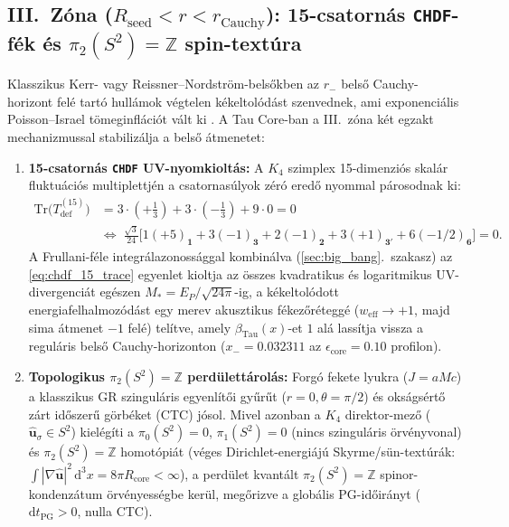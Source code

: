 \documentclass[11pt,a4paper]{article}
\theoremstyle{remark}
\begin{document}
\subsection{III.\ Z\'ona (\texorpdfstring{$R_{\mathrm{seed}} < r < r_{\mathrm{Cauchy}}$}{R\_seed < r < r\_Cauchy}): 15-csatorn\'as \texttt{CHDF}-f\'ek \'es \texorpdfstring{$\pi_2(S^2) = \mathbb{Z}$}{pi\_2(S\^2) = Z} spin-text\'ura}

Klasszikus Kerr- vagy Reissner--Nordstr\"om-bels\H{o}kben az $r_-$ bels\H{o} Cauchy-horizont fel\'e tart\'o hull\'amok v\'egtelen k\'ekeltol\'od\'ast szenvednek, ami exponenci\'alis Poisson--Israel t\"omeginfl\'aci\'ot v\'alt ki \cite{PoissonIsrael1990}. A Tau Core-ban a III.\ z\'ona k\'et egzakt mechanizmussal stabiliz\'alja a bels\H{o} \'atmenetet:
\begin{enumerate}
  \item \textbf{15-csatorn\'as \texttt{CHDF} UV-nyomkiolt\'as:} A $K_4$ szimplex 15-dimenzi\'os skal\'ar fluktu\'aci\'os multiplettj\'en a csatornas\'ulyok z\'er\'o ered\H{o} nyommal p\'arosodnak ki:
  \begin{align}
    \mathrm{Tr}\!\bigl(T_{\mathrm{def}}^{(15)}\bigr)
    &= 3\cdot\!\left(+\frac{1}{3}\right) + 3\cdot\!\left(-\frac{1}{3}\right) + 9\cdot 0 = 0 \nonumber\\
    &\Longleftrightarrow\;
    \frac{\sqrt{3}}{24}\bigl[1(+5)_{\mathbf{1}} + 3(-1)_{\mathbf{3}} + 2(-1)_{\mathbf{2}} + 3(+1)_{\mathbf{3}'} + 6(-1/2)_{\mathbf{6}}\bigr] = 0.
    \label{eq:chdf_15_trace}
  \end{align}
  A Frullani-f\'ele integr\'alazonoss\'aggal kombin\'alva (\ref{sec:big_bang}.\ szakasz) az \eqref{eq:chdf_15_trace} egyenlet kioltja az \"osszes kvadratikus \'es logaritmikus UV-divergenci\'at eg\'eszen $M_* = E_P/\sqrt{24\pi}$-ig, a k\'ekeltol\'odott energiafelhalmoz\'od\'ast egy merev akusztikus f\'ekez\H{o}r\'etegg\'e ($w_{\mathrm{eff}} \to +1$, majd sima \'atmenet $-1$ fel\'e) tel\'itve, amely $\beta_{\mathrm{Tau}}(x)$-et $1$ al\'a lass\'itja vissza a regul\'aris bels\H{o} Cauchy-horizonton ($x_- = 0.032311$ az $\epsilon_{\mathrm{core}} = 0.10$ profilon).
  \item \textbf{Topologikus $\pi_2(S^2) = \mathbb{Z}$ perd\"ulett\'arol\'as:} Forg\'o fekete lyukra ($J = aMc$) a klasszikus GR szingul\'aris egyenl\'it\H{o}i gy\H{u}r\H{u}t ($r = 0, \theta = \pi/2$) \'es oks\'ags\'ert\H{o} z\'art id\H{o}szer\H{u} g\"orb\'eket (CTC) j\'osol. Mivel azonban a $K_4$ direktor-mez\H{o} ($\hat{\mathbf{u}}_\sigma \in S^2$) kiel\'eg\'iti a $\pi_0(S^2) = 0$, $\pi_1(S^2) = 0$ (nincs szingul\'aris \"orv\'enyvonal) \'es $\pi_2(S^2) = \mathbb{Z}$ homot\'opi\'at (v\'eges Dirichlet-energi\'aj\'u Skyrme/s\"un-text\'ur\'ak: $\int |\nabla\hat{\mathbf{u}}|^2\,\mathrm{d}^3x = 8\pi R_{\mathrm{core}} < \infty$), a perd\"ulet kvant\'alt $\pi_2(S^2) = \mathbb{Z}$ spinor-kondenz\'atum \"orv\'enyess\'egbe ker\"ul, meg\H{o}rizve a glob\'alis PG-id\H{o}ir\'anyt ($\mathrm{d}t_{\mathrm{PG}} > 0$, nulla CTC).
\end{enumerate}
\end{document}
